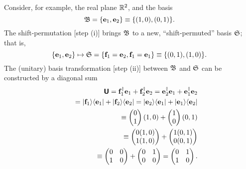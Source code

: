 {\color{blue}
\bexample
Consider, for example,
the real plane ${\Bbb R}^2$,
and the basis
$${\frak B}=\{ {\bf e}_1 , {\bf e}_2\} \equiv \{(1,0),(0,1)\}.$$
The shift-permutation [step (i)] brings ${\frak B}$ to a new, ``shift-permuted'' basis  ${\frak S}$; that is,
$$\{ {\bf e}_1 , {\bf e}_2\} \mapsto {\frak S}= \{ {\bf f}_1={\bf e}_2,{\bf f}_1={\bf e}_1 \} \equiv \{(0,1),(1,0)\}.$$
The (unitary) basis transformation [step (ii)] between $ {\frak B} $ and
$  {\frak S}$ can be constructed by a diagonal sum
\begin{equation}
\begin{split}
\textsf{\textbf{U}} ={\bf f}_1^\dagger  {\bf e}_1+ {\bf f}_2^\dagger  {\bf e}_2 = {\bf e}_2^\dagger   {\bf e}_1+ {\bf e}_1^\dagger  {\bf e}_2   \\
\qquad  =\vert {\bf f}_1\rangle \langle {\bf  e}_1\vert + \vert {\bf f}_2\rangle \langle   {\bf e}_2 \vert = \vert {\bf e}_2\rangle \langle    {\bf e}_1\vert + \vert {\bf e}_1\rangle \langle   {\bf e}_2    \vert         \\
\qquad \equiv
\begin{pmatrix}
0 \\
1
\end{pmatrix}
(1,0)+
\begin{pmatrix}
1 \\
0
\end{pmatrix}
(0,1)  \\
\qquad \equiv
\begin{pmatrix}
0 (1,0)\\
1 (1,0)
\end{pmatrix}
+
\begin{pmatrix}
1 (0,1)\\
0 (0,1)
\end{pmatrix}
   \\
\qquad \equiv
\begin{pmatrix}
0&0\\1&0
\end{pmatrix}
+
\begin{pmatrix}
0&1\\0&0
\end{pmatrix}
=
\begin{pmatrix}
0&1\\1&0
\end{pmatrix}.
\end{split}

\end{equation}}
